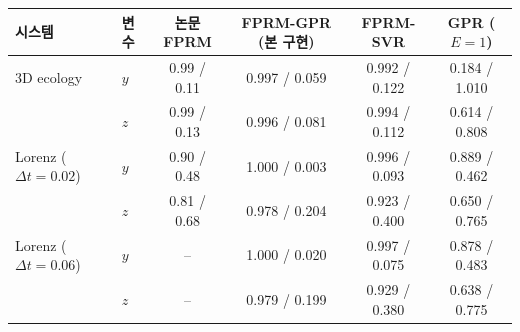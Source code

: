 \begin{tabular}{llcccc}
\toprule
시스템 & 변수 & 논문 FPRM & FPRM-GPR (본 구현) & FPRM-SVR & GPR ($E{=}1$) \\
\midrule
3D ecology & $y$ & 0.99 / 0.11 & 0.997 / 0.059 & 0.992 / 0.122 & 0.184 / 1.010 \\
 & $z$ & 0.99 / 0.13 & 0.996 / 0.081 & 0.994 / 0.112 & 0.614 / 0.808 \\
\midrule
Lorenz ($\Delta t{=}0.02$) & $y$ & 0.90 / 0.48 & 1.000 / 0.003 & 0.996 / 0.093 & 0.889 / 0.462 \\
 & $z$ & 0.81 / 0.68 & 0.978 / 0.204 & 0.923 / 0.400 & 0.650 / 0.765 \\
\midrule
Lorenz ($\Delta t{=}0.06$) & $y$ & -- & 1.000 / 0.020 & 0.997 / 0.075 & 0.878 / 0.483 \\
 & $z$ & -- & 0.979 / 0.199 & 0.929 / 0.380 & 0.638 / 0.775 \\
\bottomrule
\end{tabular}
